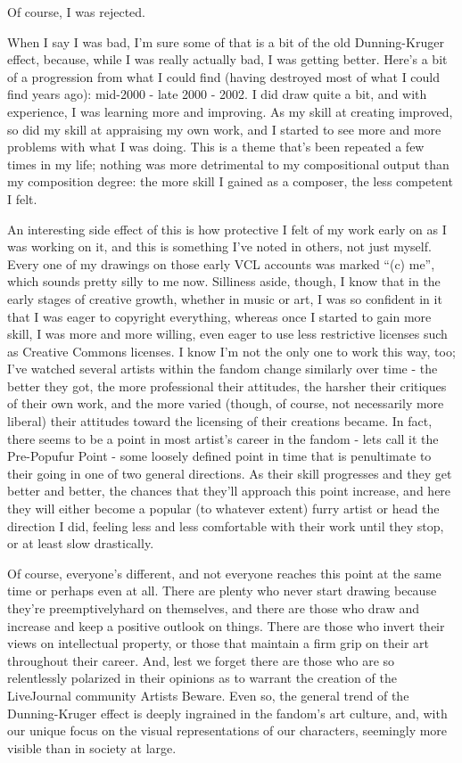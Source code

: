 Of course, I was rejected.

When I say I was bad, I'm sure some of that is a bit of the old Dunning-Kruger effect, because, while I was really actually bad, I was getting better. Here's a bit of a progression from what I could find (having destroyed most of what I could find years ago): mid-2000 - late 2000 - 2002. I did draw quite a bit, and with experience, I was learning more and improving. As my skill at creating improved, so did my skill at appraising my own work, and I started to see more and more problems with what I was doing. This is a theme that's been repeated a few times in my life; nothing was more detrimental to my compositional output than my composition degree: the more skill I gained as a composer, the less competent I felt.

An interesting side effect of this is how protective I felt of my work early on as I was working on it, and this is something I've noted in others, not just myself. Every one of my drawings on those early VCL accounts was marked ``(c) me'', which sounds pretty silly to me now. Silliness aside, though, I know that in the early stages of creative growth, whether in music or art, I was so confident in it that I was eager to copyright everything, whereas once I started to gain more skill, I was more and more willing, even eager to use less restrictive licenses such as Creative Commons licenses. I know I'm not the only one to work this way, too; I've watched several artists within the fandom change similarly over time - the better they got, the more professional their attitudes, the harsher their critiques of their own work, and the more varied (though, of course, not necessarily more liberal) their attitudes toward the licensing of their creations became. In fact, there seems to be a point in most artist's career in the fandom - lets call it the Pre-Popufur Point - some loosely defined point in time that is penultimate to their going in one of two general directions. As their skill progresses and they get better and better, the chances that they'll approach this point increase, and here they will either become a popular (to whatever extent) furry artist or head the direction I did, feeling less and less comfortable with their work until they stop, or at least slow drastically.

Of course, everyone's different, and not everyone reaches this point at the same time or perhaps even at all. There are plenty who never start drawing because they're preemptivelyhard on themselves, and there are those who draw and increase and keep a positive outlook on things. There are those who invert their views on intellectual property, or those that maintain a firm grip on their art throughout their career. And, lest we forget there are those who are so relentlessly polarized in their opinions as to warrant the creation of the LiveJournal community Artists Beware. Even so, the general trend of the Dunning-Kruger effect is deeply ingrained in the fandom's art culture, and, with our unique focus on the visual representations of our characters, seemingly more visible than in society at large.
